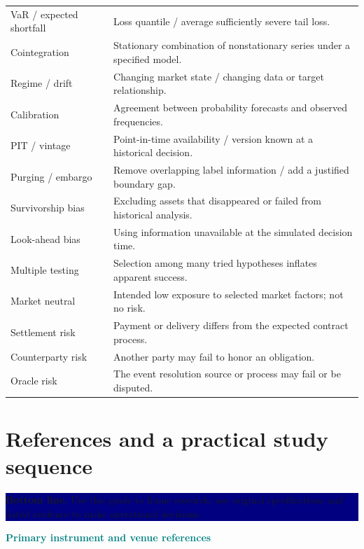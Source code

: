 \documentclass[10pt,letterpaper]{article}
\newcommand{\bl}[1]{\noindent\colorbox{navy}{\parbox{\dimexpr\linewidth-2\fboxsep}{\color{white}\textbf{Bottom line.} #1}}\par\medskip}
\newcommand{\topic}[2]{\clearpage\section{#1}\bl{#2}}
\newcommand{\sub}[1]{\par\textbf{\textcolor{teal}{#1}}\par}
\begin{document}
\begin{tabularx}{\linewidth}{@{}lX@{}}
VaR / expected shortfall & Loss quantile / average sufficiently severe tail loss.\\
Cointegration & Stationary combination of nonstationary series under a specified model.\\
Regime / drift & Changing market state / changing data or target relationship.\\
Calibration & Agreement between probability forecasts and observed frequencies.\\
PIT / vintage & Point-in-time availability / version known at a historical decision.\\
Purging / embargo & Remove overlapping label information / add a justified boundary gap.\\
Survivorship bias & Excluding assets that disappeared or failed from historical analysis.\\
Look-ahead bias & Using information unavailable at the simulated decision time.\\
Multiple testing & Selection among many tried hypotheses inflates apparent success.\\
Market neutral & Intended low exposure to selected market factors; not no risk.\\
Settlement risk & Payment or delivery differs from the expected contract process.\\
Counterparty risk & Another party may fail to honor an obligation.\\
Oracle risk & The event resolution source or process may fail or be disputed.\\\bottomrule
\end{tabularx}
\normalsize
\topic{References and a practical study sequence}{Use this guide to frame research; use original specifications and dated evidence to make operational decisions.}
\sub{Primary instrument and venue references}
\end{document}
